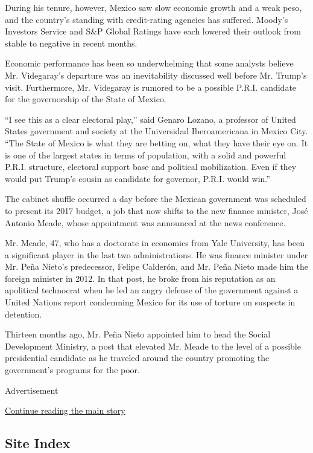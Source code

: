 During his tenure, however, Mexico saw slow economic growth and a weak
peso, and the country's standing with credit-rating agencies has
suffered. Moody's Investors Service and S\&P Global Ratings have each
lowered their outlook from stable to negative in recent months.

Economic performance has been so underwhelming that some analysts
believe Mr. Videgaray's departure was an inevitability discussed well
before Mr. Trump's visit. Furthermore, Mr. Videgaray is rumored to be a
possible P.R.I. candidate for the governorship of the State of Mexico.

``I see this as a clear electoral play,'' said Genaro Lozano, a
professor of United States government and society at the Universidad
Iberoamericana in Mexico City. ``The State of Mexico is what they are
betting on, what they have their eye on. It is one of the largest states
in terms of population, with a solid and powerful P.R.I. structure,
electoral support base and political mobilization. Even if they would
put Trump's cousin as candidate for governor, P.R.I. would win.''

The cabinet shuffle occurred a day before the Mexican government was
scheduled to present its 2017 budget, a job that now shifts to the new
finance minister, José Antonio Meade, whose appointment was announced at
the news conference.

Mr. Meade, 47, who has a doctorate in economics from Yale University,
has been a significant player in the last two administrations. He was
finance minister under Mr. Peña Nieto's predecessor, Felipe Calderón,
and Mr. Peña Nieto made him the foreign minister in 2012. In that post,
he broke from his reputation as an apolitical technocrat when he led an
angry defense of the government against a United Nations report
condemning Mexico for its use of torture on suspects in detention.

Thirteen months ago, Mr. Peña Nieto appointed him to head the Social
Development Ministry, a post that elevated Mr. Meade to the level of a
possible presidential candidate as he traveled around the country
promoting the government's programs for the poor.

Advertisement

\protect\hyperlink{after-bottom}{Continue reading the main story}

\hypertarget{site-index}{%
\subsection{Site Index}\label{site-index}}

